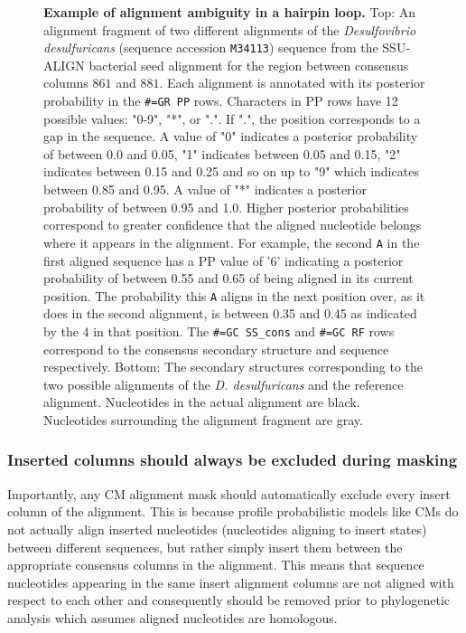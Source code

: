 \begin{figure}
\begin{center}
\caption[Example of alignment ambiguity in a hairpin loop.]{
  \textbf{Example of alignment ambiguity in a hairpin loop.}  Top: An
  alignment fragment of two different alignments of the
  \emph{Desulfovibrio desulfuricans} (sequence accession
  \texttt{M34113}) sequence from the SSU-ALIGN bacterial seed
  alignment for the region between consensus columns $861$ and $881$.
  Each alignment is annotated with its posterior probability in the
  \texttt{\#=GR PP} rows.  Characters in PP rows have 12 possible
  values: "0-9", "*", or ".". If ".", the position corresponds to a
  gap in the sequence. A value of "0" indicates a posterior
  probability of between 0.0 and 0.05, "1" indicates between 0.05 and
  0.15, "2" indicates between 0.15 and 0.25 and so on up to "9" which
  indicates between 0.85 and 0.95. A value of "*" indicates a
  posterior probability of between 0.95 and 1.0. Higher posterior
  probabilities correspond to greater confidence that the aligned
  nucleotide belongs where it appears in the alignment.  For example,
  the second \texttt{A} in the first aligned sequence has a PP value
  of '6' indicating a posterior probability of between 0.55 and 0.65
  of being aligned in its current position. The
  probability this \texttt{A} aligns in the next position over, as it
  does in the second alignment, is between 0.35 and 0.45 as indicated
  by the 4 in that position.  The \texttt{\#=GC
  SS\_cons} and \texttt{\#=GC RF} rows correspond to the consensus
  secondary structure and sequence respectively.  
  Bottom: The
  secondary structures corresponding to the two possible alignments of
  the \emph{D. desulfuricans} and the reference alignment.  Nucleotides
  in the actual alignment are black. Nucleotides surrounding the
  alignment fragment are gray.}
\end{center}
\label{fig:ambiguity}
\end{figure}

\subsubsection{Inserted columns should always be excluded during masking}

Importantly, any CM alignment mask should automatically exclude 
every insert column of the alignment. This is because profile
probabilistic models like CMs do not actually align inserted nucleotides
(nucleotides aligning to insert states) between different sequences, but
rather simply insert them between the appropriate consensus columns in
the alignment. This means that sequence nucleotides appearing in the same
insert alignment columns are not aligned with respect to each
other and consequently should be removed prior to phylogenetic
analysis which assumes aligned nucleotides are homologous.

